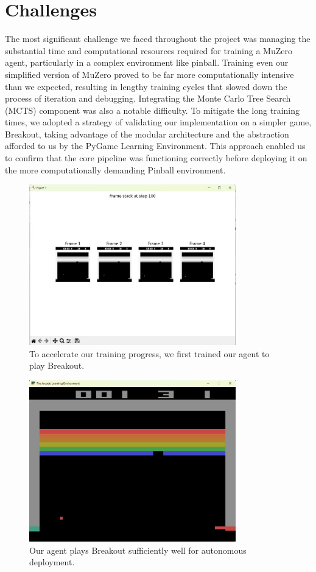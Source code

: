 \documentclass{article}
\begin{document}
\section{Challenges}
The most significant challenge we faced throughout the project was managing the substantial time and computational resources required for training a MuZero agent, particularly in a complex environment like pinball. Training even our simplified version of MuZero proved to be far more computationally intensive than we expected, resulting in lengthy training cycles that slowed down the process of iteration and debugging. Integrating the Monte Carlo Tree Search (MCTS) component was also a notable difficulty. To mitigate the long training times, we adopted a strategy of validating our implementation on a simpler game, Breakout, taking advantage of the modular architecture and the abstraction afforded to us by the PyGame Learning Environment. This approach enabled us to confirm that the core pipeline was functioning correctly before deploying it on the more computationally demanding Pinball environment.

\begin{figure}[H]
    \centering
    \includegraphics[width=0.8\textwidth]{breakout_training.jpeg}
    \caption{To accelerate our training progress, we first trained our agent to play Breakout.}
    \label{fig:breakout_training}
\end{figure}
\begin{figure}[H]
    \centering
    \includegraphics[width=0.8\textwidth]{breakout_gameplay.jpeg}
    \caption{Our agent plays Breakout sufficiently well for autonomous deployment.}
    \label{fig:breakout_gameplay}
\end{figure}
\end{document}
